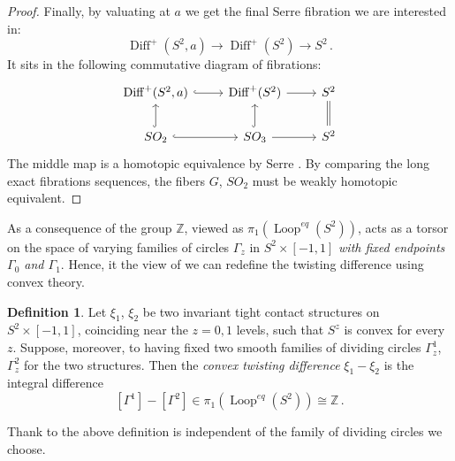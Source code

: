 \documentclass[a4paper, 11pt]{amsart}
\theoremstyle{plain}
\theoremstyle{definition}
\newtheorem{defin}[defin]{Definition}
\newcommand{\Z}{\mathbb{Z}}
\DeclareMathOperator{\Loop}{Loop}
\DeclareMathOperator{\Diff}{Diff}
\begin{document}
\begin{proof}
	Finally, by valuating at $a$ we get the final Serre fibration we are interested in:
	\[
		\Diff^+(S^2,a) \to \Diff^+(S^2) \to S^2\,.
	\]
	It sits in the following commutative diagram of fibrations:
	\[
	\begin{tikzcd}
		\Diff^+(S^2,a) & \Diff^+(S^2) & S^2 \\
		SO_2 & SO_3 & S^2
		\arrow[from = 1-1,to=1-2, hookrightarrow]
		\arrow[from = 1-2,to=1-3]
		\arrow[from = 2-1,to=2-2, hookrightarrow]
		\arrow[from = 2-2,to=2-3]
		\arrow[from = 2-1,to=1-1, hookrightarrow]
		\arrow[from = 2-2,to=1-2, hookrightarrow]
		\arrow[from = 2-3,to=1-3, shift left=1pt, no head]
		\arrow[from = 2-3,to=1-3, shift right=1pt, no head]
	\end{tikzcd}
	\]
	The middle map is a homotopic equivalence by Serre \cite{Smale1959}. By comparing the long exact fibrations sequences, the fibers $G$, $SO_2$ must be weakly homotopic equivalent.
\end{proof}
As a consequence of  the group $\Z$, viewed as $\pi_1(\Loop^{eq}(S^2))$, acts as a torsor on the space of varying families of circles $\Gamma_z$ in $S^2 \times [-1,1]$ \emph{with fixed endpoints $\Gamma_0$ and $\Gamma_1$}. Hence, it the view of  we can redefine the twisting difference using convex theory.
\begin{defin}
	Let $\xi_1$, $\xi_2$ be two invariant tight contact structures on $S^2 \times [-1,1]$, coinciding near the $z = 0,1$ levels, such that $S^z$ is convex for every $z$. Suppose, moreover, to having fixed two smooth families of dividing circles $\Gamma_z^1$, $\Gamma_z^2$ for the two structures. Then the \emph{convex twisting difference} $\xi_1 - \xi_2$ is the integral difference 
	\[
		[\Gamma^1] - [\Gamma^2] \in \pi_1(\Loop^{eq}(S^2)) \cong \Z\,.
	\]
\end{defin}
Thank to  the above definition is independent of the family of dividing circles we choose.
\end{document}
